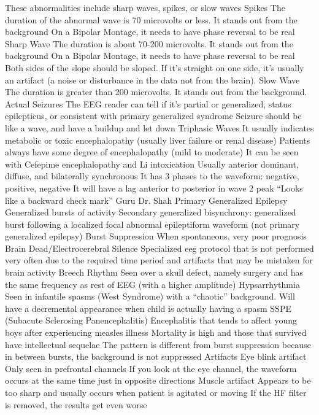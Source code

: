 \documentclass{article}
\begin{document}
These abnormalities include sharp waves, spikes, or slow waves
 Spikes
The duration of the abnormal wave is 70 microvolts or less.
It stands out from the background
On a Bipolar Montage, it needs to have phase reversal to be real
Sharp Wave
The duration is about 70-200 microvolts.
It stands out from the background
On a Bipolar Montage, it needs to have phase reversal to be real
Both sides of the slope should be sloped. If it’s straight on one side, it’s usually an artifact (a noise or disturbance in the data not from the brain).
 Slow Wave
The duration is greater than 200 microvolts.
It stands out from the background.
Actual Seizures
The EEG reader can tell if it’s partial or generalized, status epilepticus, or consistent with primary generalized syndrome 
Seizure should be like a wave, and have a buildup and let down
Triphasic Waves
It usually indicates metabolic or toxic encephalopathy (usually liver failure or renal disease)
Patients always have some degree of encephalopathy (mild to moderate)
It can be seen with Cefepime encephalopathy and Li intoxication 
Usually anterior dominant, diffuse, and bilaterally synchronous 
It has 3 phases to the waveform: negative, positive, negative
It will have a lag anterior to posterior in wave 2 peak
“Looks like a backward check mark” Guru Dr. Shah
Primary Generalized Epilepsy 
Generalized bursts of activity 
Secondary generalized bisynchrony: generalized burst following a localized focal abnormal epileptiform waveform (not primary generalized epilepsy)
Burst Suppression 
When spontaneous, very poor prognosis
Brain Dead/Electrocerebral Silence
Specialized eeg protocol that is not performed very often due to the required time period and artifacts that may be mistaken for brain activity
Breech Rhythm
Seen over a skull defect, namely surgery and has the same frequency as rest of EEG (with a higher amplitude)
Hypsarrhythmia
Seen in infantile spasms (West Syndrome) with a “chaotic” background.
Will have a decremental appearance when child is actually having a spasm 
SSPE (Subacute Sclerosing Panencephalitis)
Encephalitis that tends to affect young boys after experiencing measles illness
Mortality is high and those that survived have intellectual sequelae 
The pattern is different from burst suppression because in between bursts, the background is not suppressed
Artifacts
Eye blink artifact
Only seen in prefrontal channels
If you look at the eye channel, the waveform occurs at the same time just in opposite directions
Muscle artifact 
Appears to be too sharp and usually occurs when patient is agitated or moving
If the HF filter is removed, the results get even worse
\end{document}
